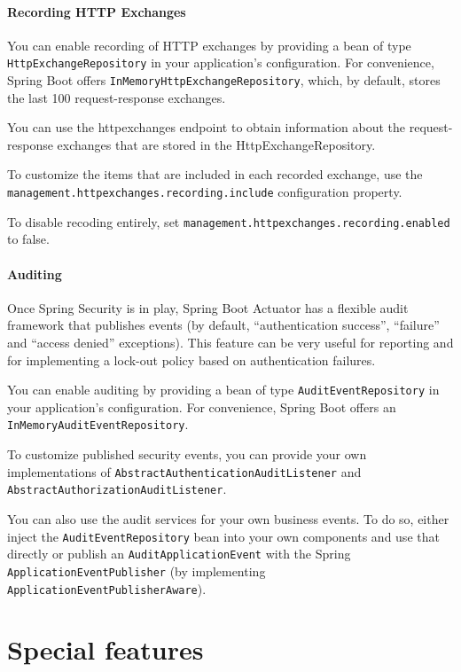 \documentclass{scrartcl}
\begin{document}
\paragraph{Recording HTTP Exchanges}

You can enable recording of HTTP exchanges by providing a bean of type \lstinline|HttpExchangeRepository| in your application’s configuration. For convenience, Spring Boot offers \lstinline|InMemoryHttpExchangeRepository|, which, by default, stores the last 100 request-response exchanges.

You can use the httpexchanges endpoint to obtain information about the request-response exchanges that are stored in the HttpExchangeRepository.

To customize the items that are included in each recorded exchange, use the \lstinline|management.httpexchanges.recording.include| configuration property.

To disable recoding entirely, set \lstinline|management.httpexchanges.recording.enabled| to false.

\paragraph{Auditing}

Once Spring Security is in play, Spring Boot Actuator has a flexible audit framework that publishes events (by default, “authentication success”, “failure” and “access denied” exceptions). This feature can be very useful for reporting and for implementing a lock-out policy based on authentication failures.

You can enable auditing by providing a bean of type \lstinline|AuditEventRepository| in your application’s configuration. For convenience, Spring Boot offers an \lstinline|InMemoryAuditEventRepository|.

To customize published security events, you can provide your own implementations of \lstinline|AbstractAuthenticationAuditListener| and \lstinline|AbstractAuthorizationAuditListener|.

You can also use the audit services for your own business events. To do so, either inject the \lstinline|AuditEventRepository| bean into your own components and use that directly or publish an \lstinline|AuditApplicationEvent| with the Spring \lstinline|ApplicationEventPublisher| (by implementing \lstinline|ApplicationEventPublisherAware|).

\section{Special features}
\end{document}
